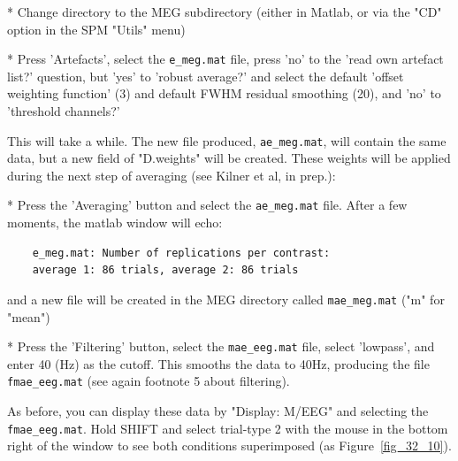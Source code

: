 * Change directory to the MEG subdirectory (either in Matlab, or via the "CD" option in the SPM "Utils" menu)

* Press 'Artefacts', select the \verb!e_meg.mat! file, press 'no' to the 'read own artefact list?' question, but 'yes' to 'robust average?' and select the default 'offset weighting function' (3) and default FWHM residual smoothing (20), and 'no' to 'threshold channels?'

This will take a while. The new file produced, \verb!ae_meg.mat!, will contain the same data, but a new field of "D.weights" will be created. These weights will be applied during the next step of averaging (see Kilner et al, in prep.):

* Press the 'Averaging' button and select the \verb!ae_meg.mat! file. After a few moments, the matlab window will echo:
\begin{verbatim}
    e_meg.mat: Number of replications per contrast:
    average 1: 86 trials, average 2: 86 trials
\end{verbatim}
    and a new file will be created in the MEG directory called \verb!mae_meg.mat!    ("m" for "mean")

* Press the 'Filtering' button, select the \verb!mae_eeg.mat! file, select 'lowpass', and enter 40 (Hz) as the cutoff. This smooths the data to 40Hz, producing the file \verb!fmae_eeg.mat! (see again footnote 5 about filtering).

As before, you can display these data by "Display: M/EEG" and selecting the \verb!fmae_eeg.mat!. Hold SHIFT and select trial-type 2 with the mouse in the bottom right of the window to see both conditions superimposed (as Figure~\ref{fig_32_10}).

